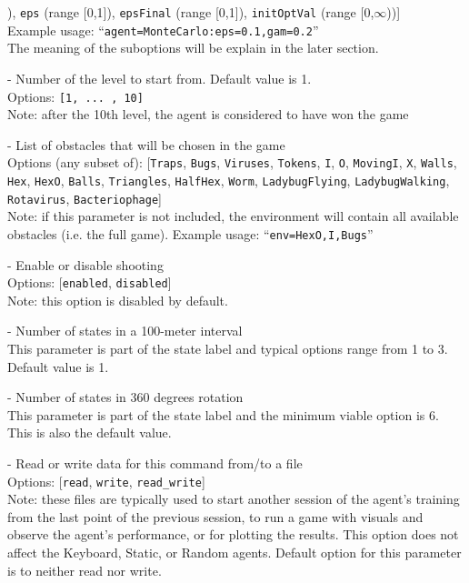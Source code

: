 \begin{description}
[\texttt{gam} (range [0,1]), \texttt{eps} (range [0,1]), \texttt{epsFinal} (range [0,1]), \texttt{initOptVal} (range [0,$\infty$))]\\
Example usage: ``\texttt{agent=MonteCarlo:eps=0.1,gam=0.2}''\\
The meaning of the suboptions will be explain in the later section.
\item[level] - Number of the level to start from. Default value is 1. \label{opt:level}\\
Options: \texttt{[1, ... , 10]}\\
Note: after the 10th level, the agent is considered to have won the game
\item[env] - List of obstacles that will be chosen in the game \label{opt:env}\\
Options (any subset of): [\texttt{Traps}, \texttt{Bugs}, \texttt{Viruses}, \texttt{Tokens},
\texttt{I}, \texttt{O}, \texttt{MovingI}, \texttt{X}, \texttt{Walls}, \texttt{Hex},
\texttt{HexO}, \texttt{Balls}, \texttt{Triangles}, \texttt{HalfHex},
\texttt{Worm}, \texttt{LadybugFlying}, \texttt{LadybugWalking},
\texttt{Rotavirus}, \texttt{Bacteriophage}]\\
Note: if this parameter is not included, the environment will contain all available obstacles (i.e. the full game).
Example usage: ``\texttt{env=HexO,I,Bugs}''\\
\item[shooting] - Enable or disable shooting \label{opt:shooting}\\
Options: [\texttt{enabled}, \texttt{disabled}]\\
Note: this option is disabled by default.
\item[dists] - Number of states in a 100-meter interval \label{opt:dists}\\
This parameter is part of the state label and typical options range from 1 to 3. Default value is 1.
\item[rots] - Number of states in 360 degrees rotation \label{opt:rots}\\
This parameter is part of the state label and the minimum viable option is 6. This is also the default value.
\item[database] - Read or write data for this command from/to a file \label{opt:database}\\
Options: [\texttt{read}, \texttt{write}, \texttt{read\_write}]\\
Note: these files are typically used to start another session of the agent's training from the last point of the previous session, to run a game with visuals and observe the agent's performance, or for plotting the results. This option does not affect the Keyboard, Static, or Random agents. Default option for this parameter is to neither read nor write.

\end{description}
